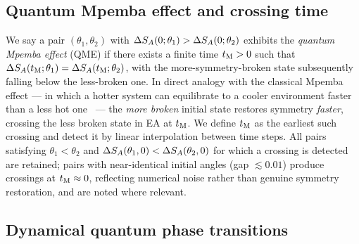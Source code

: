 \subsection{Quantum Mpemba effect and crossing time}
\label{sec:QME}

We say a pair $(\theta_1, \theta_2)$ with $\Delta S_A(0;\theta_1) > \Delta S_A(0;\theta_2)$ exhibits
the \emph{quantum Mpemba effect} (QME) if there exists a finite time $t_{\rm M} > 0$ such that
$\Delta S_A(t_{\rm M};\theta_1) = \Delta S_A(t_{\rm M};\theta_2)$, with the more-symmetry-broken state
subsequently falling below the less-broken one.
In direct analogy with the classical Mpemba effect — in which a hotter system can
equilibrate to a cooler environment faster than a less hot one~\cite{Mpemba1969} — the
\emph{more broken} initial state restores symmetry \emph{faster}, crossing the less
broken state in EA at $t_{\rm M}$.
We define $t_{\rm M}$ as the earliest such crossing and detect it by linear interpolation
between time steps. All pairs satisfying $\theta_1 < \theta_2$ and
$\Delta S_A(\theta_1,0) < \Delta S_A(\theta_2,0)$ for which a crossing is detected are
retained; pairs with near-identical initial angles (gap $\lesssim 0.01$) produce
crossings at $t_{\rm M} \approx 0$, reflecting numerical noise rather than genuine
symmetry restoration, and are noted where relevant.

\subsection{Dynamical quantum phase transitions}
\label{sec:DQPT}


